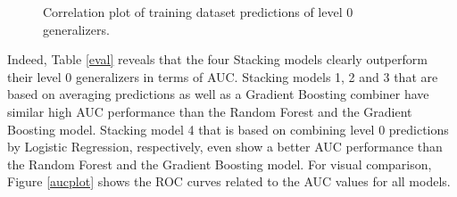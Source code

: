 \documentclass[12pt]{article}
\begin{document}
\begin{figure}[htp] 
\caption[Correlation plot of predictions]{Correlation plot of training dataset predictions of level 0 generalizers.}\label{corrgram}
\end{figure}  

Indeed, Table \ref{eval} reveals that the four Stacking models clearly outperform their level 0 generalizers in terms of AUC. Stacking models 1, 2 and 3 that are based on averaging predictions as well as a Gradient Boosting combiner have similar high AUC performance than the Random Forest and the Gradient Boosting model. Stacking model 4 that is based on combining level 0 predictions by Logistic Regression, respectively, even show a better AUC performance than the Random Forest and the Gradient Boosting model. For visual comparison, Figure \ref{aucplot} shows the ROC curves related to the AUC values for all models.
\end{document}
